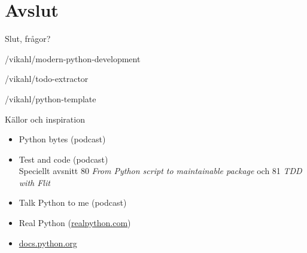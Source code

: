 {%
\section*{Avslut}
}

\begin{frame}[standout]
  Slut, frågor?

  {\small{}/vikahl/modern-python-development}

  {\small{}/vikahl/todo-extractor}

  {\small{}/vikahl/python-template}
\end{frame}

\begin{frame}
  \titlepage{}
\end{frame}

\begin{frame}{Källor och inspiration}
  \begin{itemize}
    \item Python bytes (podcast)
    \item Test and code (podcast)\\
      {\small Speciellt avsnitt 80 \emph{From Python script to maintainable package} och 81 \emph{TDD with Flit}}
    \item Talk Python to me (podcast)
    \item Real Python (\url{realpython.com})
    \item \url{docs.python.org}
  \end{itemize}
\end{frame}
